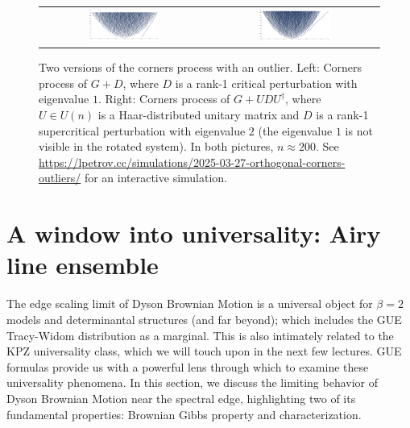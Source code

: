 \documentclass[letterpaper,11pt,oneside,reqno]{article}
\numberwithin{equation}{section}
\theoremstyle{definition}
\begin{document}
\begin{figure}[]
	\centering
	\begin{tabular}{cc}
		\includegraphics[width=0.45\textwidth]{pictures/outlier.png} &
		\includegraphics[width=0.45\textwidth]{pictures/rotated_outlier.png}
	\end{tabular}
	\caption{Two versions of the corners process with an outlier.
	Left: Corners process of $G+D$, where $D$ is a rank-1 critical perturbation with eigenvalue
	$1$. Right: Corners process of $G+UDU^\dagger$, where
	$U\in U(n)$ is a Haar-distributed unitary matrix and $D$
	is a rank-1 supercritical perturbation with eigenvalue $2$
	(the eigenvalue $1$ is not visible in the rotated system).
	In both pictures, $n\approx 200$. See
	\url{https://lpetrov.cc/simulations/2025-03-27-orthogonal-corners-outliers/}
	for an interactive simulation.}
	\label{fig:outlier-evolution}
\end{figure}


\section{A window into universality: Airy line ensemble}

The edge scaling limit of Dyson Brownian Motion is a universal object for $\beta=2$ models and determinantal structures (and far beyond); which includes the GUE Tracy-Widom distribution as a marginal. This is also intimately related to the KPZ universality class, which we will touch upon in the next few lectures.
GUE formulas
provide us with a powerful lens through which to examine these universality phenomena. In this section, we discuss the limiting behavior of Dyson Brownian Motion near the spectral edge, highlighting two of its fundamental properties: Brownian Gibbs property and characterization.
\end{document}
